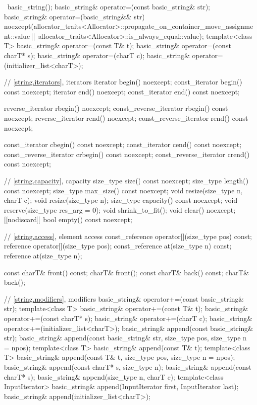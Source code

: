 \begin{codeblock}
{{    ~basic_string();
    basic_string& operator=(const basic_string& str);
    basic_string& operator=(basic_string&& str)
      noexcept(allocator_traits<Allocator>::propagate_on_container_move_assignment::value ||
               allocator_traits<Allocator>::is_always_equal::value);
    template<class T>
      basic_string& operator=(const T& t);
    basic_string& operator=(const charT* s);
    basic_string& operator=(charT c);
    basic_string& operator=(initializer_list<charT>);

    // \ref{string.iterators}, iterators
    iterator       begin() noexcept;
    const_iterator begin() const noexcept;
    iterator       end() noexcept;
    const_iterator end() const noexcept;

    reverse_iterator       rbegin() noexcept;
    const_reverse_iterator rbegin() const noexcept;
    reverse_iterator       rend() noexcept;
    const_reverse_iterator rend() const noexcept;

    const_iterator         cbegin() const noexcept;
    const_iterator         cend() const noexcept;
    const_reverse_iterator crbegin() const noexcept;
    const_reverse_iterator crend() const noexcept;

    // \ref{string.capacity}, capacity
    size_type size() const noexcept;
    size_type length() const noexcept;
    size_type max_size() const noexcept;
    void resize(size_type n, charT c);
    void resize(size_type n);
    size_type capacity() const noexcept;
    void reserve(size_type res_arg = 0);
    void shrink_to_fit();
    void clear() noexcept;
    [[nodiscard]] bool empty() const noexcept;

    // \ref{string.access}, element access
    const_reference operator[](size_type pos) const;
    reference       operator[](size_type pos);
    const_reference at(size_type n) const;
    reference       at(size_type n);

    const charT& front() const;
    charT&       front();
    const charT& back() const;
    charT&       back();

    // \ref{string.modifiers}, modifiers
    basic_string& operator+=(const basic_string& str);
    template<class T>
      basic_string& operator+=(const T& t);
    basic_string& operator+=(const charT* s);
    basic_string& operator+=(charT c);
    basic_string& operator+=(initializer_list<charT>);
    basic_string& append(const basic_string& str);
    basic_string& append(const basic_string& str, size_type pos, size_type n = npos);
    template<class T>
      basic_string& append(const T& t);
    template<class T>
      basic_string& append(const T& t, size_type pos, size_type n = npos);
    basic_string& append(const charT* s, size_type n);
    basic_string& append(const charT* s);
    basic_string& append(size_type n, charT c);
    template<class InputIterator>
      basic_string& append(InputIterator first, InputIterator last);
    basic_string& append(initializer_list<charT>);

}}
\end{codeblock}
